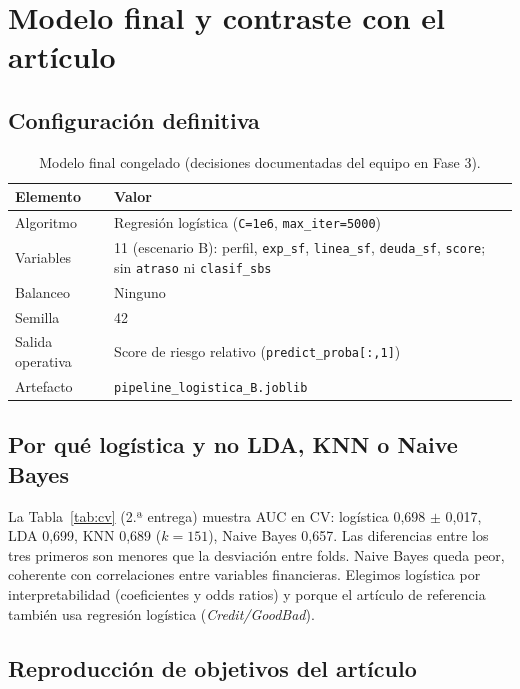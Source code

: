 \documentclass[11pt]{article}
\begin{document}
\section{Modelo final y contraste con el artículo}

\subsection{Configuración definitiva}

\begin{table}[H]
\centering
\caption{Modelo final congelado (decisiones documentadas del equipo en Fase 3).}
\label{tab:config}
\small
\begin{tabular}{@{}ll@{}}
\toprule
\textbf{Elemento} & \textbf{Valor} \\
\midrule
Algoritmo & Regresión logística (\texttt{C=1e6}, \texttt{max\_iter=5000}) \\
Variables & 11 (escenario B): perfil, \texttt{exp\_sf}, \texttt{linea\_sf}, \texttt{deuda\_sf}, \texttt{score}; sin \texttt{atraso} ni \texttt{clasif\_sbs} \\
Balanceo & Ninguno \\
Semilla & 42 \\
Salida operativa & Score de riesgo relativo (\texttt{predict\_proba[:,1]}) \\
Artefacto & \texttt{pipeline\_logistica\_B.joblib} \\
\bottomrule
\end{tabular}
\end{table}

\subsection{Por qué logística y no LDA, KNN o Naive Bayes}

La Tabla~\ref{tab:cv} (2.ª entrega) muestra AUC en CV: logística 0,698 $\pm$ 0,017, LDA 0,699, KNN 0,689 ($k=151$), Naive Bayes 0,657. Las diferencias entre los tres primeros son menores que la desviación entre folds. Naive Bayes queda peor, coherente con correlaciones entre variables financieras. Elegimos logística por interpretabilidad (coeficientes y odds ratios) y porque el artículo de referencia también usa regresión logística (\textit{Credit/GoodBad}).

\subsection{Reproducción de objetivos del artículo}
\end{document}
